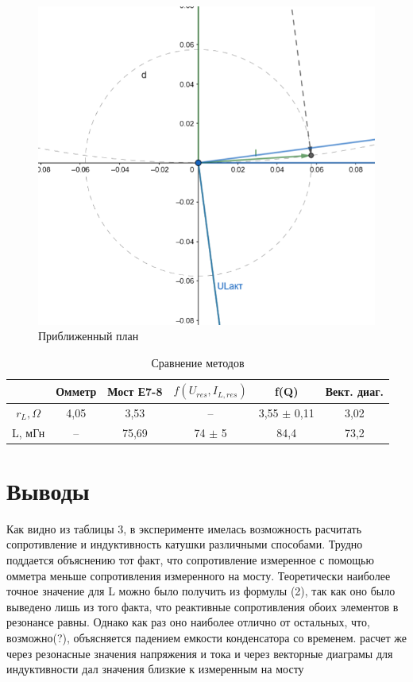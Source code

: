 \documentclass[a4paper, 12pt]{article}
\begin{document}
\begin{enumerate}
\begin{figure}[h]
\begin{center}
\begin{minipage}[h]{0.49\linewidth}
\includegraphics[width=0.88\linewidth]{Малый.png}
\caption{Приближенный план}
\label{ris:experimcoded}
\end{minipage}
\end{center}
\end{figure}
\begin{table}[!h]
\begin{center}
\caption{Сравнение методов}
\begin{tabular}{|c|c|c|c|c|c|}
\hline
   & Омметр & Мост Е7-8 & $f(U_{res}, I_{L, res})$ & f(Q)         & Вект. диаг. \\ \hline
$r_{L}, \Omega$ & 4,05   & 3,53      & --             & 3,55 $\pm$ 0,11 & 3,02        \\ \hline
L, мГн  & --     & 75,69     & 74 $\pm$ 5        & 84,4         & 73,2        \\ \hline
\end{tabular}
\end{center}
\end{table}

\end{enumerate}
\newpage
 \section{Выводы}
 Как видно из таблицы 3, в эксперименте имелась возможность расчитать сопротивление и индуктивность катушки различными способами. Трудно поддается объяснению тот факт, что сопротивление измеренное с помощью омметра меньше сопротивления измеренного на мосту. Теоретически наиболее точное значение для L можно было получить из формулы (2), так как оно было выведено лишь из того факта, что реактивные сопротивления обоих элементов в резонансе равны. Однако как раз оно наиболее отлично от остальных, что, возможно(?), объясняется падением емкости конденсатора со временем. расчет же через резонасные значения напряжения и тока и через векторные диаграмы для индуктивности дал значения близкие к измеренным на мосту
\end{document}
